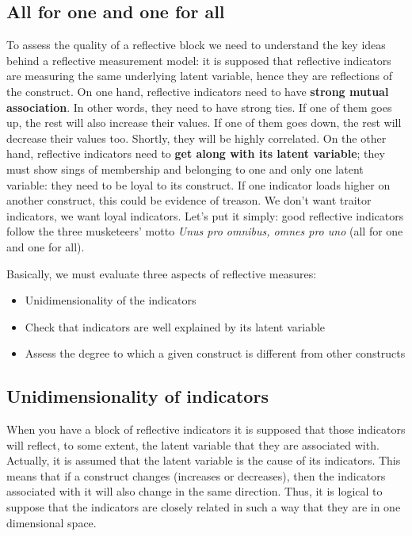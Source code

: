 \documentclass[12pt]{book}\usepackage{graphicx, color}
\begin{document}
\subsection{All for one and one for all}
To assess the quality of a reflective block we need to understand the key ideas behind a reflective measurement model: it is supposed that reflective indicators are measuring the same underlying latent variable, hence they are reflections of the construct. On one hand, reflective indicators need to have \textbf{strong mutual association}. In other words, they need to have strong ties. If one of them goes up, the rest will also increase their values. If one of them goes down, the rest will decrease their values too. Shortly, they will be highly correlated. On the other hand, reflective indicators need to \textbf{get along with its latent variable}; they must show sings of membership and belonging to one and only one latent variable: they need to be loyal to its construct. If one indicator loads higher on another construct, this could be evidence of treason. We don't want traitor indicators, we want loyal indicators. Let's put it simply: good reflective indicators follow the three musketeers' motto \textit{Unus pro omnibus, omnes pro uno} (all for one and one for all).

Basically, we must evaluate three aspects of reflective measures:
\begin{itemize}
 \item Unidimensionality of the indicators
 \item Check that indicators are well explained by its latent variable
 \item Assess the degree to which a given construct is different from other constructs
\end{itemize}


\subsection{Unidimensionality of indicators}
When you have a block of reflective indicators it is supposed that those indicators will reflect, to some extent, the latent variable that they are associated with. Actually, it is assumed that the latent variable is the cause of its indicators. This means that if a construct changes (increases or decreases), then the indicators associated with it will also change in the same direction. Thus, it is logical to suppose that the indicators are closely related in such a way that they are in one dimensional space. 
\end{document}

